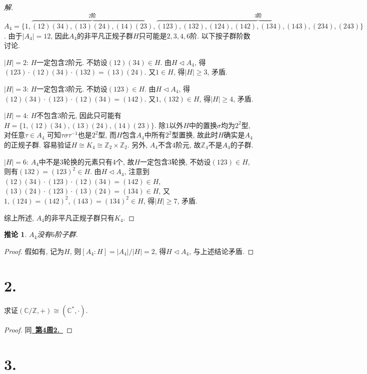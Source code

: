 \documentclass[12pt, a4paper, fontset=windows]{ctexart}
\newcommand{\C}{\mathbb{C}}
\newcommand{\Z}{\mathbb{Z}}
\newcommand{\abs}[1]{\left|{#1}\right|}
\newcommand{\isom}{\cong} %
\newcommand{\myref}[2][]{\hyperref[#1]{\color{blue}\ {#2}\ }}
\newtheorem*{corollary}{推论}
\newenvironment{solution}{\begin{proof}[解]}{\end{proof}}
\begin{document}
\begin{solution}
$A_4=\{1,\overbrace{(12)(34),(13)(24),(14)(23)}^{2\text{阶}},\overbrace{(123),(132),(124),(142),(134),(143),(234),(243)}^{3\text{阶}}\}$. 
由于$\abs{A_4}=12$, 因此$A_4$的非平凡正规子群$H$只可能是$2,3,4,6$阶. 以下按子群阶数讨论. 

$\abs{H}=2$: $H$一定包含$2$阶元. 不妨设$(12)(34)\in H$. 由$H\lhd A_4$, 
得$(123)\cdot(12)(34)\cdot(132)=(13)(24)$. 又$1\in H$, 
得$\abs{H}\ge 3$, 矛盾. 

$\abs{H}=3$: $H$一定包含$3$阶元. 不妨设$(123)\in H$. 由$H\lhd A_4$, 
得$(12)(34)\cdot(123)\cdot(12)(34)=(142)$. 又$1,(132)\in H$, 
得$\abs{H}\ge 4$, 矛盾. 

$\abs{H}=4$: $H$不包含$3$阶元, 因此只可能有$H=\{1,(12)(34),(13)(24),(14)(23)\}$. 
除$1$以外$H$中的置换$\sigma$均为$2^2$型, 对任意$\tau\in A_4$
可知$\tau\sigma\tau^{-1}$也是$2^2$型, 而$H$包含$A_4$中所有$2^2$型置换, 
故此时$H$确实是$A_4$的正规子群. 容易验证$H\isom K_4\isom \Z_2\times\Z_2$. 
另外, $A_4$不含$4$阶元, 故$\Z_4$不是$A_4$的子群. 

$\abs{H}=6$: $A_4$中不是$3$轮换的元素只有$4$个, 故$H$一定包含$3$轮换, 
不妨设$(123)\in H$, 则有$(132)=(123)^2\in H$. 由$H\lhd A_4$, 
注意到$(12)(34)\cdot(123)\cdot(12)(34)=(142)\in H$, 
$(13)(24)\cdot(123)\cdot(13)(24)=(134)\in H$, 
又$1,(124)=(142)^2,(143)=(134)^2\in H$, 得$\abs{H}\ge 7$, 矛盾. 

综上所述, $A_4$的非平凡正规子群只有$K_4$. 
\end{solution}

\begin{corollary}
$A_4$没有$6$阶子群. 
\end{corollary}

\begin{proof}
假如有, 记为$H$, 则$[A_4:H]=\abs{A_4}/\abs{H}=2$, 
得$H\lhd A_4$, 与上述结论矛盾. 
\end{proof}

\section*{2.}

求证$(\C/\Z,+)\isom(\C^*,\cdot)$. 

\begin{proof}
同\myref[C-exp]{\bf 第4周2.}
\end{proof}

\section*{3.}
\end{document}
